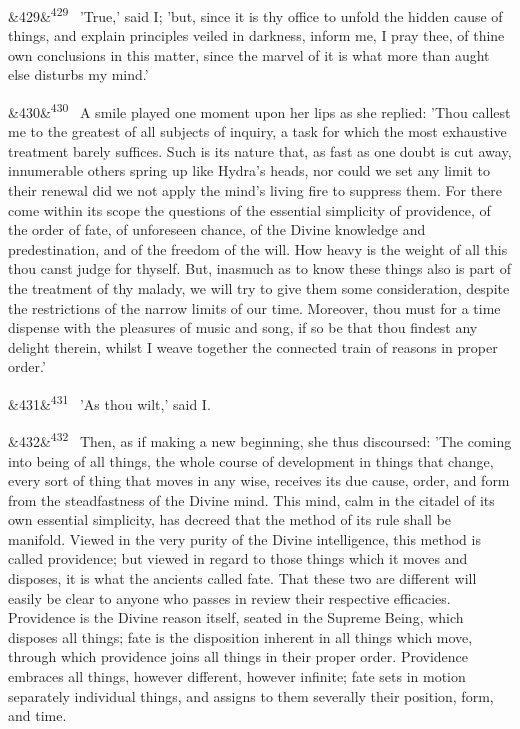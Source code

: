 \documentclass[12pt]{article}
\newcommand{\para}[1][]{\par\noindent\ifx&#1&\else\textsuperscript{\footnotesize #1}~\fi}
\begin{document}
\para[429] 'True,' said I; 'but, since it is thy office to unfold the hidden cause of things, and explain principles veiled in darkness, inform me, I pray thee, of thine own conclusions in this matter, since the marvel of it is what more than aught else disturbs my mind.'

\para[430] A smile played one moment upon her lips as she replied: 'Thou callest me to the greatest of all subjects of inquiry, a task for which the most exhaustive treatment barely suffices. Such is its nature that, as fast as one doubt is cut away, innumerable others spring up like Hydra's heads, nor could we set any limit to their renewal did we not apply the mind's living fire to suppress them. For there come within its scope the questions of the essential simplicity of providence, of the order of fate, of unforeseen chance, of the Divine knowledge and predestination, and of the freedom of the will. How heavy is the weight of all this thou canst judge for thyself. But, inasmuch as to know these things also is part of the treatment of thy malady, we will try to give them some consideration, despite the restrictions of the narrow limits of our time. Moreover, thou must for a time dispense with the pleasures of music and song, if so be that thou findest any delight therein, whilst I weave together the connected train of reasons in proper order.'

\para[431] 'As thou wilt,' said I.

\para[432] Then, as if making a new beginning, she thus discoursed: 'The coming into being of all things, the whole course of development in things that change, every sort of thing that moves in any wise, receives its due cause, order, and form from the steadfastness of the Divine mind. This mind, calm in the citadel of its own essential simplicity, has decreed that the method of its rule shall be manifold. Viewed in the very purity of the Divine intelligence, this method is called providence; but viewed in regard to those things which it moves and disposes, it is what the ancients called fate. That these two are different will easily be clear to anyone who passes in review their respective efficacies. Providence is the Divine reason itself, seated in the Supreme Being, which disposes all things; fate is the disposition inherent in all things which move, through which providence joins all things in their proper order. Providence embraces all things, however different, however infinite; fate sets in motion separately individual things, and assigns to them severally their position, form, and time.
\end{document}
